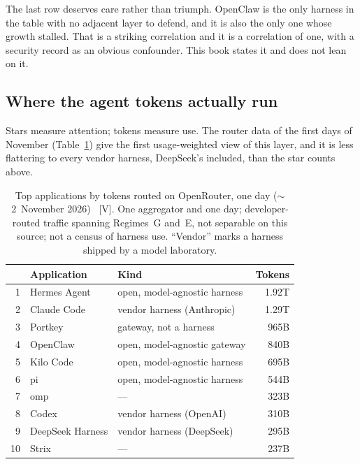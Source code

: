 The last row deserves care rather than triumph. OpenClaw is the only harness in the table with no adjacent layer to defend, and it is also the only one whose growth stalled. That is a striking correlation and it is a correlation of one, with a security record as an obvious confounder. This book states it and does not lean on it.

\subsection{Where the agent tokens actually run}
\label{sec:mdl-harness-tokens}

Stars measure attention; tokens measure use. The router data of the first days of November (Table~\ref{tab:mdl-harness-tokens}) give the first usage-weighted view of this layer, and it is less flattering to every vendor harness, DeepSeek's included, than the star counts above.

\begin{table}[htbp]
  \centering\footnotesize
  \caption{Top applications by tokens routed on OpenRouter, one day ($\sim$2~November 2026)~\cite{mdl-openrouter-oct26} [V]. One aggregator and one day; developer-routed traffic spanning Regimes~G and~E, not separable on this source; not a census of harness use. ``Vendor'' marks a harness shipped by a model laboratory.}
  \label{tab:mdl-harness-tokens}
  \begin{tabular}{@{}rp{34mm}p{56mm}r@{}}
    \toprule
    & \textbf{Application} & \textbf{Kind} & \textbf{Tokens} \\
    \midrule
    1 & Hermes Agent & open, model-agnostic harness & 1.92T \\
    2 & Claude Code & vendor harness (Anthropic) & 1.29T \\
    3 & Portkey & gateway, not a harness & 965B \\
    4 & OpenClaw & open, model-agnostic gateway & 840B \\
    5 & Kilo Code & open, model-agnostic harness & 695B \\
    6 & pi & open, model-agnostic harness & 544B \\
    7 & omp & --- & 323B \\
    8 & Codex & vendor harness (OpenAI) & 310B \\
    9 & DeepSeek Harness & vendor harness (DeepSeek) & 295B \\
    10 & Strix & --- & 237B \\
    \bottomrule
  \end{tabular}
\end{table}

